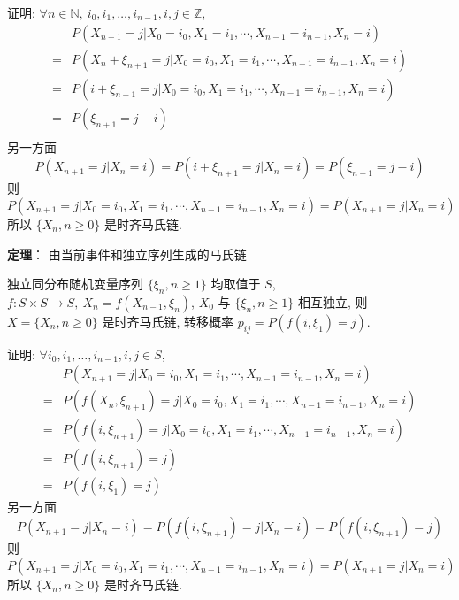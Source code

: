 \documentclass[openany]{ctexbook}
\theoremstyle{kaiti}
\theoremstyle{normal}
\begin{document}
证明: $\forall n\in\mathbb{N},\ i_0,i_1,\ldots,i_{n-1},i,j\in \mathbb{Z}$, 
\begin{equation}
  \begin{aligned}
    & P(X_{n+1}=j|X_0=i_0,X_1=i_1,\cdots,X_{n-1}=i_{n-1},X_n=i)\\
    =& P(X_n+\xi_{n+1}=j|X_0=i_0,X_1=i_1,\cdots,X_{n-1}=i_{n-1},X_n=i)\\
    =& P(i+\xi_{n+1}=j|X_0=i_0,X_1=i_1,\cdots,X_{n-1}=i_{n-1},X_n=i)\\
    =& P(\xi_{n+1}=j-i)\\
  \end{aligned} 
\end{equation} 另一方面 
\begin{equation}
  P(X_{n+1}=j|X_n=i)=P(i+\xi_{n+1}=j|X_n=i)=P(\xi_{n+1}=j-i) 
\end{equation} 则 
\begin{equation}
  P(X_{n+1}=j|X_0=i_0,X_1=i_1,\cdots,X_{n-1}=i_{n-1},X_n=i)=P(X_{n+1}=j|X_n=i) 
\end{equation} 所以 $\{X_n,n\geqslant0\}$ 是时齐马氏链.

\textbf{定理}： 由当前事件和独立序列生成的马氏链

独立同分布随机变量序列 $\{\xi_n,n\geqslant1\}$ 均取值于 $S$, $f:S\times S\to S,\ X_n=f(X_{n-1},\xi_n)$, $X_0$ 与 $\{\xi_n,n\geqslant1\}$ 相互独立, 则 $X=\{X_n,n\geqslant0\}$ 是时齐马氏链, 转移概率 $p_{ij}=P(f(i,\xi_1)=j)$.

证明: $\forall i_0,i_1,\ldots,i_{n-1},i,j\in S$,
\begin{equation}
  \begin{aligned}
    & P(X_{n+1}=j|X_0=i_0,X_1=i_1,\cdots,X_{n-1}=i_{n-1},X_n=i)\\
    =& P(f(X_n,\xi_{n+1})=j|X_0=i_0,X_1=i_1,\cdots,X_{n-1}=i_{n-1},X_n=i)\\
    =& P(f(i,\xi_{n+1})=j|X_0=i_0,X_1=i_1,\cdots,X_{n-1}=i_{n-1},X_n=i)\\
    =& P(f(i,\xi_{n+1})=j)\\
    =& P(f(i,\xi_1)=j)
  \end{aligned}
\end{equation} 另一方面 
\begin{equation}
  P(X_{n+1}=j|X_n=i)=P(f(i,\xi_{n+1})=j|X_n=i)=P(f(i,\xi_{n+1})=j) 
\end{equation} 则 
\begin{equation}
  P(X_{n+1}=j|X_0=i_0,X_1=i_1,\cdots,X_{n-1}=i_{n-1},X_n=i)=P(X_{n+1}=j|X_n=i) 
\end{equation} 所以 $\{X_n,n\geqslant0\}$ 是时齐马氏链.
\end{document}
